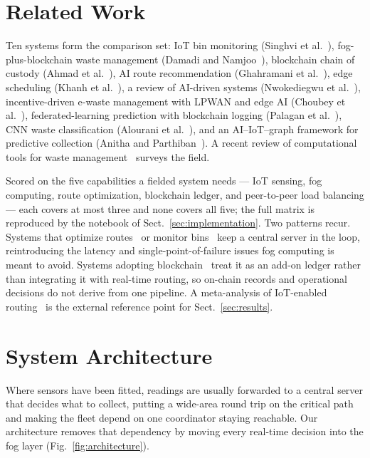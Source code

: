 \documentclass{llncs}
\begin{document}
\section{Related Work}
\label{sec:related}

Ten systems form the comparison set:
IoT bin monitoring (Singhvi et al.~\cite{singhvi}),
fog-plus-blockchain waste management (Damadi and Namjoo~\cite{damadi}),
blockchain chain of custody (Ahmad et al.~\cite{ahmad}), AI route
recommendation (Ghahramani et al.~\cite{ghahramani}), edge scheduling (Khanh
et al.~\cite{khanh}), a review of AI-driven systems (Nwokediegwu et
al.~\cite{nwokediegwu}), incentive-driven e-waste management with LPWAN and
edge AI (Choubey et al.~\cite{choubey}), federated-learning prediction with
blockchain logging (Palagan et al.~\cite{palagan}), CNN waste classification
(Alourani et al.~\cite{alourani}), and an AI--IoT--graph framework for
predictive collection (Anitha and Parthiban~\cite{anitha}). A recent review of
computational tools for waste management~\cite{nesmachnow} surveys the field.

Scored on the five capabilities a fielded system needs --- IoT sensing, fog
computing, route optimization, blockchain ledger, and peer-to-peer load
balancing --- each covers at most three and none covers all five; the full
matrix is reproduced by the notebook of Sect.~\ref{sec:implementation}. Two
patterns recur. Systems that optimize routes~\cite{ghahramani,anitha} or
monitor bins~\cite{singhvi} keep a central server in the loop, reintroducing
the latency and single-point-of-failure issues fog computing is meant to
avoid. Systems adopting blockchain~\cite{ahmad,palagan,damadi} treat it as an
add-on ledger rather than integrating it with real-time routing, so on-chain
records and operational decisions do not derive from one pipeline. A
meta-analysis of IoT-enabled routing~\cite{maciel} is the external reference
point for Sect.~\ref{sec:results}.

\section{System Architecture}
\label{sec:architecture}

Where sensors have been fitted, readings are usually forwarded to a central
server that decides what to collect, putting a wide-area round trip on the
critical path and making the fleet depend on one coordinator staying
reachable. Our architecture removes that dependency by moving every real-time
decision into the fog layer (Fig.~\ref{fig:architecture}).
\end{document}
